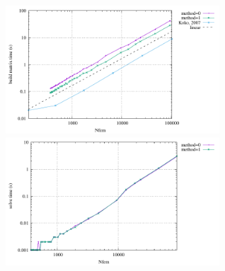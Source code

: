 \begin{center}
\includegraphics[width=8cm]{python_codes/fieldstone_179/RESULTS/build.pdf}
\includegraphics[width=8cm]{python_codes/fieldstone_179/RESULTS/solve.pdf}
\end{center}


